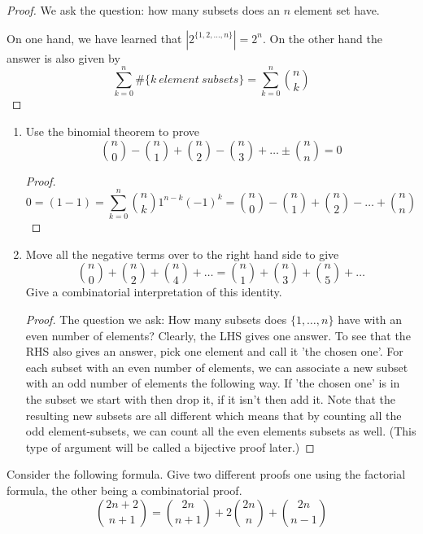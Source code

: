 \documentclass[11pt]{preprint}
\def\enumb{\begin{enumerate}}
\def\enume{\end{enumerate}}
\begin{document}
\begin{proof}
We ask the question: how many subsets does an $n$ element set have.

On one hand, we have learned that $|2^{\{1,2,\dots,n\}}|=2^n$. On the other hand the answer is also given by
\[
\sum_{k=0}^{n} \#\{k~element~subsets\}=\sum_{k=0}^{n}\binom{n}{k}
\]
\end{proof}

\item 
\enumb
\item Use the binomial theorem to prove
\[
\binom{n}{0}-\binom{n}{1}+\binom{n}{2}-\binom{n}{3}+\dots\pm\binom{n}{n}=0
\]
\begin{proof}
\[
0=(1-1)=\sum_{k=0}^n\binom{n}{k}1^{n-k}(-1)^{k}=\binom{n}{0}-\binom{n}{1}+\binom{n}{2}-\dots+\binom{n}{n}
\]
\end{proof}
\item Move all the negative terms over to the right hand side to give
\[
\binom{n}{0}+\binom{n}{2}+\binom{n}{4}+\dots=\binom{n}{1}+\binom{n}{3}+\binom{n}{5}+\dots
\]
Give a combinatorial interpretation of this identity.

\begin{proof}
The question we ask: How many subsets does $\{1,\dots,n\}$ have with an even number of elements? Clearly, the LHS gives one answer. To see that the RHS also gives an answer, pick one element and call it 'the chosen one'. For each subset with an even number of elements, we can associate a new subset with an odd number of elements the following way. If 'the chosen one' is in the subset we start with then drop it, if it isn't then add it. Note that the resulting new subsets are all different which means that by counting all the odd element-subsets, we can count all the even elements subsets as well. (This type of argument will be called a bijective proof later.)
\end{proof}
\enume

\newpage
\item Consider the following formula. Give two different proofs one using the factorial formula, the other being a combinatorial proof.
\[
\binom{2n+2}{n+1}=\binom{2n}{n+1}+2\binom{2n}{n}+\binom{2n}{n-1}
\]
\end{document}
